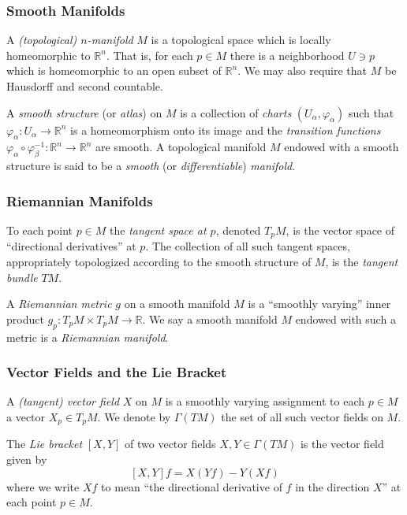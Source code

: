 \documentclass[handout]{beamer}
\newcommand{\R}{\mathbb{R}}
\theoremstyle{definition}
\begin{document}
\begin{frame}
    \frametitle{Smooth Manifolds}

    \begin{definition}
        A \emph{(topological) $n$-manifold} $M$ is a topological space which is
        locally homeomorphic to $\R^n$. That is, for each $p \in M$ there is
        a neighborhood $U \ni p$ which is homeomorphic to an open subset of $\R^n$.
        We may also require that $M$ be Hausdorff and second countable.
    \end{definition}
    \begin{definition}
        A \emph{smooth structure} (or \emph{atlas}) on $M$ is a collection
        of \emph{charts} $(U_\alpha, \varphi_\alpha)$ such that
        $\varphi_\alpha : U_\alpha \to \R^n$ is a homeomorphism onto its image
        and the \emph{transition functions}
        $\varphi_\alpha \circ \varphi_\beta^{-1} : \R^n \to \R^n$
        are smooth. A topological manifold $M$ endowed with a smooth structure is
        said to be a \emph{smooth} (or \emph{differentiable}) \emph{manifold}.
    \end{definition}
\end{frame}

\begin{frame}
    \frametitle{Riemannian Manifolds}

    \begin{definition}
        To each point $p \in M$ the \emph{tangent space at $p$}, denoted $T_pM$,
        is the vector space of ``directional derivatives'' at $p$. The collection
        of all such tangent spaces, appropriately topologized according to the
        smooth structure of $M$, is the \emph{tangent bundle} $TM$.
    \end{definition}
    \begin{definition}
        A \emph{Riemannian metric} $g$ on a smooth manifold $M$ is a ``smoothly varying''
        inner product $g_p : T_pM \times T_pM \to \R$.
        We say a smooth manifold $M$ endowed with such a metric is a \emph{Riemannian manifold}.
    \end{definition}
\end{frame}

\begin{frame}
    \frametitle{Vector Fields and the Lie Bracket}

    \begin{definition}
        A \emph{(tangent) vector field} $X$ on $M$ is a smoothly varying assignment
        to each $p \in M$ a vector $X_p \in T_pM$. We denote by $\Gamma(TM)$ the
        set of all such vector fields on $M$.
    \end{definition}

    \begin{definition}
        The \emph{Lie bracket} $[X,Y]$ of two vector fields $X, Y \in \Gamma(TM)$
        is the vector field given by
        \[
          [X,Y]f = X(Yf) - Y(Xf)  
        \]
        where we write $Xf$ to mean ``the directional derivative of $f$ in the direction $X$''
        at each point $p \in M$.
    \end{definition}

\end{frame}
\end{document}
